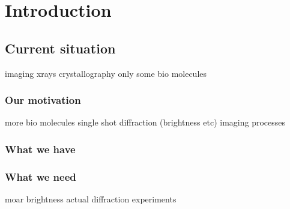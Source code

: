 \chapter{Introduction}

\ifpdf
    \graphicspath{{1_introduction/figures/PNG/}{1_introduction/figures/PDF/}{1_introduction/figures/}}
\else
    \graphicspath{{1_introduction/figures/EPS/}{1_introduction/figures/}}
\fi


\section{Current situation}
imaging
xrays
crystallography
only some bio molecules

\subsection{Our motivation}
more bio molecules
single shot diffraction (brightness etc)
imaging processes

\subsection{What we have}


\subsection{What we need}
moar brightness
actual diffraction experiments





